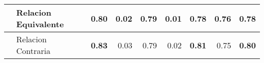 \begin{table}[h]
\begin{center}
{\begin{tabular}{llrrrrrrr}
                   & Relacion Equivalente                       & 0.80                                 & 0.02                             & 0.79                             & 0.01                             & 0.78                             & 0.76                                  & 0.78                                  \\ \hline
                   & Relacion Contraria                      & \textbf{0.83}                        & 0.03                             & 0.79                             & 0.02                             & \textbf{0.81}                    & 0.75                                  & \textbf{0.80}                         \\ \hline
\end{tabular}

}
\end{center}
\end{table}